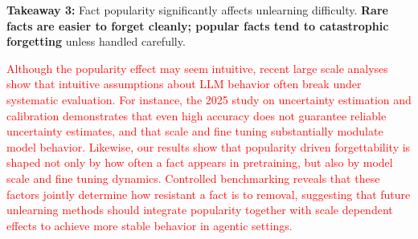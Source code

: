 \documentclass[sigconf,anonymous]{aamas}
\begin{document}
\begin{tcolorbox}[colback=gray!10, colframe=black!50, 
  boxrule=0.5pt, arc=3pt, left=6pt, right=6pt, top=4pt, bottom=4pt]
\textbf{Takeaway 3:} Fact popularity significantly affects unlearning difficulty. \textbf{Rare facts are easier to forget cleanly; popular facts tend to catastrophic forgetting }unless handled carefully.
\end{tcolorbox}

\textcolor{red}{
Although the popularity effect may seem intuitive, recent large scale analyses show that intuitive assumptions about LLM behavior often break under systematic evaluation. For instance, the 2025 study on uncertainty estimation and calibration \cite{tao2025revisiting} demonstrates that even high accuracy does not guarantee reliable uncertainty estimates, and that scale and fine tuning substantially modulate model behavior. Likewise, our results show that popularity driven forgettability is shaped not only by how often a fact appears in pretraining, but also by model scale and fine tuning dynamics. Controlled benchmarking reveals that these factors jointly determine how resistant a fact is to removal, suggesting that future unlearning methods should integrate popularity together with scale dependent effects to achieve more stable behavior in agentic settings.
}


\end{document}
